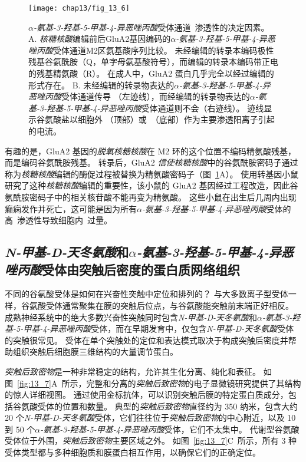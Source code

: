 \begin{figure}[htbp]
	\centering
	\texttt{[image: chap13/fig\_13\_6]}
	\caption{\textit{$\alpha$-氨基-3-羟基-5-甲基-4-异恶唑丙酸}受体通道~渗透性的决定因素。
		A. \textit{核糖核酸}编辑前后GluA2基因编码的\textit{$\alpha$-氨基-3-羟基-5-甲基-4-异恶唑丙酸}受体通道M2区氨基酸序列比较。
		未经编辑的转录本编码极性残基谷氨酰胺（Q，单字母氨基酸符号），而编辑的转录本编码带正电的残基精氨酸（R）。
		在成人中，GluA2 蛋白几乎完全以经过编辑的形式存在。
		B. 未经编辑的转录物表达的\textit{$\alpha$-氨基-3-羟基-5-甲基-4-异恶唑丙酸}受体通道传导 （左迹线），而经编辑的转录物表达的\textit{$\alpha$-氨基-3-羟基-5-甲基-4-异恶唑丙酸}受体通道则不会（右迹线）。
		迹线显示谷氨酸盐以细胞外 （顶部）或~（底部）作为主要渗透阳离子引起的电流\cite{sakmann1992nobel}。}
	\label{fig:13_6}
\end{figure}


有趣的是，GluA2 基因的\textit{脱氧核糖核酸}在 M2 环的这个位置不编码精氨酸残基，而是编码谷氨酰胺残基。
转录后，GluA2 \textit{信使核糖核酸}中的谷氨酰胺密码子通过称为\textit{核糖核酸}编辑的酶促过程被替换为精氨酸密码子（图~\ref{fig:13_6}A）。
使用转基因小鼠研究了这种\textit{核糖核酸}编辑的重要性，该小鼠的 GluA2 基因经过工程改造，因此谷氨酰胺密码子中的相关核苷酸不能再变为精氨酸。
这些小鼠在出生后几周内出现癫痫发作并死亡，这可能是因为所有\textit{$\alpha$-氨基-3-羟基-5-甲基-4-异恶唑丙酸}受体的高~渗透性导致细胞内~过量。



\subsection{\textit{N-甲基-D-天冬氨酸}和\textit{$\alpha$-氨基-3-羟基-5-甲基-4-异恶唑丙酸}受体由突触后密度的蛋白质网络组织}

不同的谷氨酸受体是如何在兴奋性突触中定位和排列的？ 
与大多数离子型受体一样，谷氨酸受体通常聚集在膜的突触后位点，与谷氨酸能突触前末端正好相反。
成熟神经系统中的绝大多数兴奋性突触同时包含\textit{N-甲基-D-天冬氨酸}和\textit{$\alpha$-氨基-3-羟基-5-甲基-4-异恶唑丙酸}受体，而在早期发育中，仅包含\textit{N-甲基-D-天冬氨酸}受体的突触很常见。
受体在单个突触处的定位和表达模式取决于构成突触后密度并帮助组织突触后细胞膜三维结构的大量调节蛋白。


\textit{突触后致密物}是一种非常稳定的结构，允许其生化分离、纯化和表征。
如图~\ref{fig:13_7}A~所示，完整和分离的\textit{突触后致密物}的电子显微镜研究提供了其结构的惊人详细视图。 
通过使用金标抗体，可以识别突触后膜的特定蛋白质成分，包括谷氨酸受体的位置和数量。
典型的\textit{突触后致密物}直径约为 350 纳米，包含大约 20 个\textit{N-甲基-D-天冬氨酸}受体，它们往往位于\textit{突触后致密物}的中心附近，以及 10 到 50 个\textit{$\alpha$-氨基-3-羟基-5-甲基-4-异恶唑丙酸}受体，它们不太集中。
代谢型谷氨酸受体位于外围，\textit{突触后致密物}主要区域之外。
如图~\ref{fig:13_7}C~所示，所有 3 种受体类型都与多种细胞质和膜蛋白相互作用，以确保它们的正确定位。


